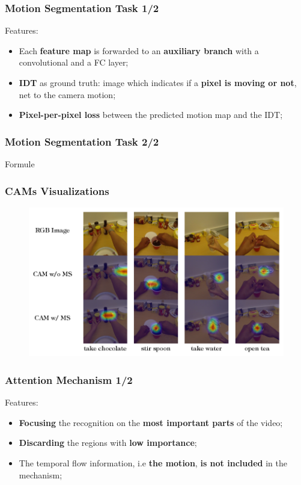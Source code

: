\documentclass{beamer}
\begin{document}
\begin{frame}
\frametitle{Motion Segmentation Task 1/2}

Features:
\begin{itemize}
\item Each \textbf{feature map} is forwarded to an \textbf{auxiliary branch} with a convolutional and a FC layer;
\item \textbf{IDT} as ground truth: image which indicates if a \textbf{pixel is moving or not}, net to the camera motion;
\item \textbf{Pixel-per-pixel loss} between the predicted motion map and the IDT;
\end{itemize}

\end{frame}

\begin{frame}
\frametitle{Motion Segmentation Task 2/2}

Formule

\end{frame}

\begin{frame}
\frametitle{CAMs Visualizations}

\begin{figure}
\includegraphics[width=\textwidth]{../schemi/cams_img}
\end{figure}

\end{frame}

\begin{frame}
\frametitle{Attention Mechanism 1/2}

Features:
\begin{itemize}
\item \textbf{Focusing} the recognition on the \textbf{most important parts} of the video;
\item \textbf{Discarding} the regions with \textbf{low importance};
\item The temporal flow information, i.e \textbf{the motion}, \textbf{is not included} in the mechanism;
\end{itemize}

\end{frame}
\end{document}
